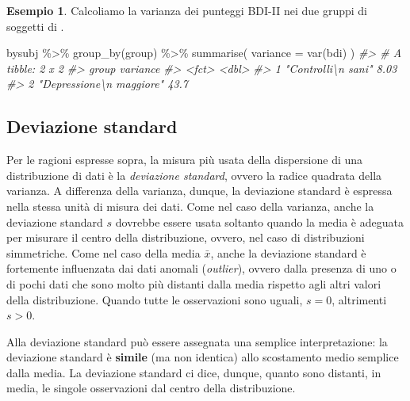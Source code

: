 \documentclass[
  10pt,
  italian,
  a4paper,
  extrafontsizes,onecolumn,openright
  ]{memoir}
\newenvironment{Shaded}{\begin{snugshade}}{\end{snugshade}}
\newcommand{\AttributeTok}[1]{\textcolor[rgb]{0.77,0.63,0.00}{#1}}
\newcommand{\CommentTok}[1]{\textcolor[rgb]{0.56,0.35,0.01}{\textit{#1}}}
\newcommand{\FunctionTok}[1]{\textcolor[rgb]{0.00,0.00,0.00}{#1}}
\newcommand{\NormalTok}[1]{#1}
\newcommand{\SpecialCharTok}[1]{\textcolor[rgb]{0.00,0.00,0.00}{#1}}
\theoremstyle{definition}
\theoremstyle{definition}
\newtheorem{example}{Esempio}[chapter]
\theoremstyle{definition}
\theoremstyle{definition}
\theoremstyle{remark}
\begin{document}
\begin{example}

Calcoliamo la varianza dei punteggi BDI-II nei due gruppi di soggetti di \textcite{zetschefuture2019}.

\begin{Shaded}
\begin{Highlighting}[]
\NormalTok{bysubj }\SpecialCharTok{\%\textgreater{}\%}
  \FunctionTok{group\_by}\NormalTok{(group) }\SpecialCharTok{\%\textgreater{}\%}
  \FunctionTok{summarise}\NormalTok{(}
    \AttributeTok{variance =} \FunctionTok{var}\NormalTok{(bdi)}
\NormalTok{  )}
\CommentTok{\#\textgreater{} \# A tibble: 2 x 2}
\CommentTok{\#\textgreater{}   group                    variance}
\CommentTok{\#\textgreater{}   \textless{}fct\textgreater{}                       \textless{}dbl\textgreater{}}
\CommentTok{\#\textgreater{} 1 "Controlli\textbackslash{}n sani"           8.03}
\CommentTok{\#\textgreater{} 2 "Depressione\textbackslash{}n maggiore"    43.7}
\end{Highlighting}
\end{Shaded}

\end{example}

\hypertarget{deviazione-standard}{%
\subsection{Deviazione standard}\label{deviazione-standard}}

Per le ragioni espresse sopra, la misura più usata della dispersione di una distribuzione di dati è la \emph{deviazione standard}, ovvero la radice quadrata della varianza. A differenza della varianza, dunque, la deviazione standard è espressa nella stessa unità di misura dei dati. Come nel caso della varianza, anche la deviazione standard \(s\) dovrebbe essere usata soltanto quando la media è adeguata per misurare il centro della distribuzione, ovvero, nel caso di distribuzioni simmetriche. Come nel caso della media \(\bar{x}\), anche la deviazione standard è fortemente influenzata dai dati anomali (\emph{outlier}), ovvero dalla presenza di uno o di pochi dati che sono molto più distanti dalla media rispetto agli altri valori della distribuzione. Quando tutte le osservazioni sono uguali, \(s=0\), altrimenti \(s > 0\).

Alla deviazione standard può essere assegnata una semplice interpretazione: la deviazione standard è \textbf{simile} (ma non identica) allo scostamento medio semplice dalla media. La deviazione standard ci dice, dunque, quanto sono distanti, in media, le singole osservazioni dal centro della distribuzione.
\end{document}
